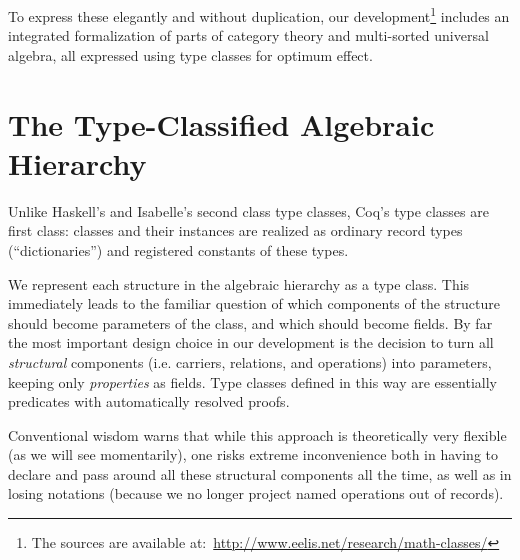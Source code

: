 \documentclass{llncs}
\begin{document}
To express these elegantly and without duplication, our development\footnote{The sources are available
at:~\url{http://www.eelis.net/research/math-classes/}} includes an integrated formalization of parts of category theory and multi-sorted universal algebra, all expressed using type classes for optimum effect.


\section{The Type-Classified Algebraic Hierarchy}\label{classes}

Unlike Haskell's and Isabelle's second class type classes, Coq's type classes are first class: classes and their instances are realized as ordinary record types (``dictionaries'') and registered constants of these types.

We represent each structure in the algebraic hierarchy as a type class. This immediately leads to the familiar question of which components of the structure should become parameters of the class, and which should become fields. By far the most important design choice in our development is the decision to turn all \emph{structural} components (i.e. carriers, relations, and operations) into parameters, keeping only \emph{properties} as fields. Type classes defined in this way are essentially predicates with automatically resolved proofs.

Conventional wisdom warns that while this approach is theoretically very flexible (as we will see momentarily), one risks extreme inconvenience both in having to declare and pass around all these structural components all the time, as well as in losing notations (because we no longer project named operations out of records).
\end{document}
